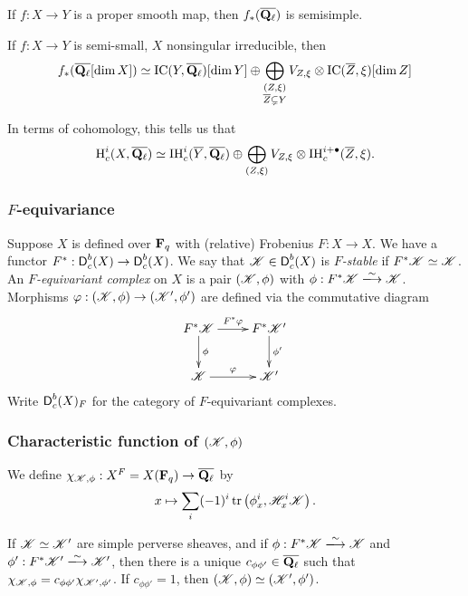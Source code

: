 \begin{theo}
If $f:X\to Y$ is a proper smooth map, then 
$f_\ast(\overline{\mathbf{Q}_\ell})$ is semisimple. 
\end{theo}

\begin{coro}
If $f:X\to Y$ is semi-small, $X$ nonsingular irreducible, then 
\[
  f_\ast(\overline{\mathbf{Q}_\ell}[\dim X]) \simeq \operatorname{IC}(Y,\overline{\mathbf{Q}_\ell})[\dim Y]\oplus \bigoplus_{\substack{(Z,\xi) \\ \overline Z\subsetneq Y}} V_{Z,\xi} \otimes \operatorname{IC}(\overline Z,\xi)[\dim Z] 
\]
\end{coro}

In terms of cohomology, this tells us that 
\[
  \operatorname{H}_c^i(X,\overline{\mathbf{Q}_\ell}) \simeq \operatorname{IH}_c^i(\overline Y,\overline{\mathbf{Q}_\ell}) \oplus \bigoplus_{(Z,\xi)} V_{Z,\xi} \otimes \operatorname{IH}_c^{i+\bullet}(\overline Z,\xi) .
\]


\subsubsection{\texorpdfstring{$F$}{F}-equivariance}

Suppose $X$ is defined over $\mathbf{F}_q$ with (relative) Frobenius 
$F:X\to X$. We have a functor $F^\ast:\operatorname{\mathsf{D}}_c^b(X) \to \operatorname{\mathsf{D}}_c^b(X)$. 
We say that $\mathscr{K}\in \operatorname{\mathsf{D}}_c^b(X)$ is \emph{$F$-stable} if 
$F^\ast \mathscr{K}\simeq \mathscr{K}$. An \emph{$F$-equivariant complex} on $X$ is a pair 
$(\mathscr{K},\phi)$ with $\phi:F^\ast \sK\isomorphism \sK$. Morphisms 
$\varphi:(\mathscr{K},\phi) \to (\mathscr{K}',\phi')$ are defined via the commutative diagram 
\[\xymatrix{
  F^\ast \sK \ar[r]^-{F^\ast\varphi} \ar[d]^-\phi 
    & F^\ast \sK' \ar[d]^-{\phi'} \\
  \sK \ar[r]^-\varphi 
    & \sK' 
}\]
Write $\operatorname{\mathsf{D}}_c^b(X)_F$ for the category of $F$-equivariant complexes. 


\subsubsection{Characteristic function of \texorpdfstring{$(\mathscr{K},\phi)$}{(K,phi)}}

We define $\chi_{\mathscr{K},\phi}:X^F=X(\mathbf{F}_q) \to \overline{\mathbf{Q}_\ell}$ by 
\[
  x\mapsto \sum_i (-1)^i \operatorname{tr}\left(\phi_x^i, \mathscr{H}_x^i\mathscr{K}\right) .
\]

\begin{lemm}
If $\mathscr{K}\simeq \mathscr{K}'$ are simple perverse sheaves, and if 
$\phi:F^\ast\sK \isomorphism \sK$ and $\phi':F^\ast \sK'\isomorphism \sK'$, 
then there is a unique $c_{\phi\phi'}\in \overline{\mathbf{Q}_\ell}$ such that 
$\chi_{\mathscr{K},\phi} = c_{\phi\phi'} \chi_{\mathscr{K}',\phi'}$. If 
$c_{\phi\phi'}=1$, then $(\mathscr{K},\phi)\simeq (\mathscr{K}',\phi')$. 
\end{lemm}

